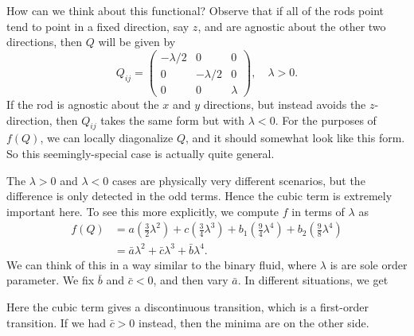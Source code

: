 \documentclass[a4paper]{article}
\begin{document}
How can we think about this functional? Observe that if all of the rods point tend to point in a fixed direction, say $z$, and are agnostic about the other two directions, then $Q$ will be given by
\[
  Q_{ij} =
  \begin{pmatrix}
    -\lambda/2 & 0 & 0\\
    0 & -\lambda/2 & 0\\
    0 & 0 & \lambda
  \end{pmatrix},\quad \lambda > 0.
\]
If the rod is agnostic about the $x$ and $y$ directions, but instead avoids the $z$-direction, then $Q_{ij}$ takes the same form but with $\lambda < 0$. For the purposes of $f(Q)$, we can locally diagonalize $Q$, and it should somewhat look like this form. So this seemingly-special case is actually quite general.

The $\lambda > 0$ and $\lambda < 0$ cases are physically very different scenarios, but the difference is only detected in the odd terms. Hence the cubic term is extremely important here. To see this more explicitly, we compute $f$ in terms of $\lambda$ as
\begin{align*}
  f(Q) &= a \left(\frac{3}{2} \lambda^2\right) + c \left(\frac{3}{4} \lambda^3\right) + b_1\left(\frac{9}{4} \lambda^4\right) + b_2 \left(\frac{9}{8} \lambda^4\right)\\
  &= \bar{a} \lambda^2 + \bar{c} \lambda^3 + \bar{b}\lambda^4.
\end{align*}
We can think of this in a way similar to the binary fluid, where $\lambda$ is are sole order parameter. We fix $\bar{b}$ and $\bar{c} < 0$, and then vary $\bar{a}$. In different situations, we get
\begin{center}
\end{center}
Here the cubic term gives a discontinuous transition, which is a first-order transition. If we had $\bar{c} > 0$ instead, then the minima are on the other side.
\end{document}
